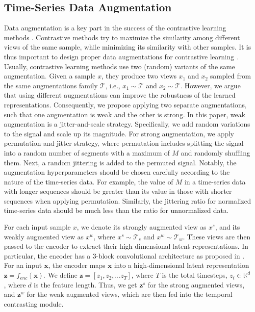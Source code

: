 \documentclass{article}
\begin{document}
\subsection{Time-Series Data Augmentation}
Data augmentation is a key part in the success of the contrastive learning methods \cite{chen2020simple,grill2020bootstrap}. Contrastive methods try to maximize the similarity among different views of the same sample, while minimizing its similarity with other samples. It is thus important to design proper data augmentations for contrastive learning \cite{chen2020simple,mohsenvand20a}. Usually, contrastive learning methods use two (random) variants of the same augmentation. Given a sample $x$, they produce two views $x_1$ and $x_2$ sampled from the same augmentations family $\mathcal{T}$, i.e.,  $x_1 \!\sim\! \mathcal{T}$ and $x_2 \!\sim\! \mathcal{T}$. However, we argue that using different augmentations can improve the robustness of the learned representations. Consequently, we propose applying two separate augmentations, such that one augmentation is weak and the other is strong. In this paper, weak augmentation is a jitter-and-scale strategy. Specifically, we add random variations to the signal and scale up its magnitude. For strong augmentation, we apply permutation-and-jitter strategy, where permutation includes splitting the signal into a random number of segments with a maximum of $M$ and randomly shuffling them. Next, a random jittering is added to the permuted signal.
Notably, the augmentation hyperparameters should be chosen carefully according to the nature of the time-series data. For example, the value of $M$ in a time-series data with longer sequences should be greater than its value in those with shorter sequences when applying permutation. Similarly, the jittering ratio for normalized time-series data should be much less than the ratio for unnormalized data.

For each input sample $x$, we denote its strongly augmented view as $x^s$, and its weakly augmented view as $x^w$, where $x^s \!\sim\! \mathcal{T}_s$ and $x^w \!\sim\! \mathcal{T}_w$.
These views are then passed to the encoder to extract their high dimensional latent representations. In particular, the encoder has a 3-block convolutional architecture as proposed in \cite{wang2017time}. For an input $\mathbf{x}$, the encoder maps $\mathbf{x}$ into a high-dimensional latent representation $\mathbf{z} = f_{enc}(\mathbf{x})$.
We define $\mathbf{z} = [z_1, z_2, \dots z_{T}]$, where $T$ is the total timesteps, $z_i \in \mathbb{R}^{d}$, where $d$ is the feature length.
Thus, we get $\mathbf{z}^s$ for the strong augmented views, and $\mathbf{z}^w$ for the weak augmented views, which are then fed into the temporal contrasting module.
\end{document}
